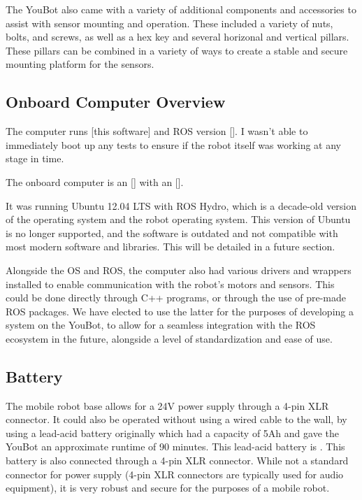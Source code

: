 \documentclass[a4paper, 12pt]{article}
\newif\ifshownotes
\newcommand{\notes}[1]{\ifshownotes\textcolor{blue}{#1}\fi}
\begin{document}
    
    \notes{DESCRIBE THE INITIAL INSPECTION IN FULL HERE! TALK ABOUT THE PILLAR STUFF AND NUTS AND WHATNOT AS WELL!!!!}

    The YouBot also came with a variety of additional components and accessories to assist with sensor mounting and operation. These included a variety of nuts, bolts, and screws, as well as a hex key and several horizonal and vertical pillars. These pillars can be combined in a variety of ways to create a stable and secure mounting platform for the sensors. 

    \subsection{Onboard Computer Overview}
    The computer runs [this software] and ROS version []. I wasn't able to immediately boot up any tests to ensure if the robot itself was working at any stage in time. 

    \notes{what ports are there? what software is on there? ubuntu? initial setup? ROS version? software?}
    The onboard computer is an [] with an []. 

    It was running Ubuntu 12.04 LTS with ROS Hydro, which is a decade-old version of the operating system and the robot operating system. This version of Ubuntu is no longer supported, and the software is outdated and not compatible with most modern software and libraries. This will be detailed in a future section.

    Alongside the OS and ROS, the computer also had various drivers and wrappers installed to enable communication with the robot's motors and sensors. This could be done directly through C++ programs, or through the use of pre-made ROS packages. We have elected to use the latter for the purposes of developing a system on the YouBot, to allow for a seamless integration with the ROS ecosystem in the future, alongside a level of standardization and ease of use. 


    \subsection{Battery}
    
    The mobile robot base allows for a 24V power supply through a 4-pin XLR connector. It could also be operated without using a wired cable to the wall, by using a lead-acid battery originally which had a capacity of 5Ah and gave the YouBot an approximate runtime of 90 minutes. This lead-acid battery is \notes{[dimensions here]}. This battery is also connected through a 4-pin XLR connector. While not a standard connector for power supply (4-pin XLR connectors are typically used for audio equipment), it is very robust and secure for the purposes of a mobile robot. 
\end{document}
